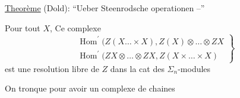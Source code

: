 \uline{Theorème} (Dold): ``Ueber Steenrodsche operationen --''

Pour tout $X$, Ce complexe
\[
\left.\begin{gathered}
\operatorname{Hom}^{'}(Z(X\ldots\times X),Z(X)\otimes\ldots\otimes ZX\\
\operatorname{Hom}^{'}(ZX\otimes\ldots\otimes ZX,Z(X\times\ldots\times X)
\end{gathered}\right\}
\]
est une resolution libre de $Z$ dans la cat des $\Sigma_n$-modules

On tronque pour avoir un complexe de chaines
